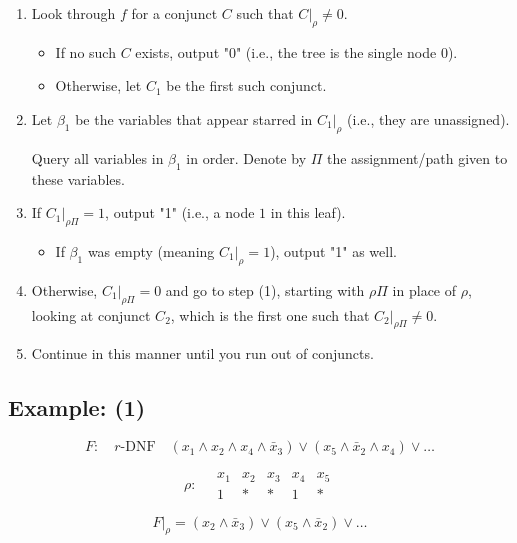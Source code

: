 \begin{enumerate}
    \item Look through \( f \) for a conjunct \( C \) such that \( C|_{\rho} \neq 0 \).
    \begin{itemize}
        \item If no such \( C \) exists, output "0" (i.e., the tree is the single node \( 0 \)).
        \item Otherwise, let \( C_1 \) be the first such conjunct.
    \end{itemize}
    
    \item Let \( \beta_1 \) be the variables that appear starred in \( C_1|_{\rho} \) (i.e., they are unassigned).
    
    Query all variables in \( \beta_1 \) in order. Denote by \( \Pi \) the assignment/path given to these variables.
    
    \item If \( C_1|_{\rho\Pi} = 1 \), output "1" (i.e., a node \( 1 \) in this leaf).
    \begin{itemize}
        \item If \( \beta_1 \) was empty (meaning \( C_1|_{\rho} = 1 \)), output "1" as well.
    \end{itemize}
    
    \item Otherwise, \( C_1|_{\rho\Pi} = 0 \) and go to step (1), starting with \( \rho\Pi \) in place of \( \rho \), looking at conjunct \( C_2 \), which is the first one such that \( C_2|_{\rho\Pi} \neq 0 \).
    
    \item Continue in this manner until you run out of conjuncts.
\end{enumerate}

\subsection*{Example: (1)}

\[
F: \quad r\text{-DNF} \quad (x_1 \land x_2 \land x_4 \land \bar{x}_3) \lor (x_5 \land \bar{x}_2 \land x_4) \lor \dots
\]

\[
\rho: \quad 
\begin{array}{ccccc}
x_1 & x_2 & x_3 & x_4 & x_5 \\
1 & * & * & 1 & *
\end{array}
\]

\[
F|_{\rho} = (x_2 \land \bar{x}_3) \lor (x_5 \land \bar{x}_2) \lor \dots
\]

